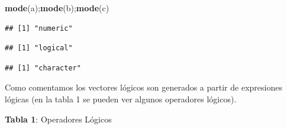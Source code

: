 \documentclass[]{article}
\newenvironment{Shaded}{\begin{snugshade}}{\end{snugshade}}
\newcommand{\KeywordTok}[1]{\textcolor[rgb]{0.13,0.29,0.53}{\textbf{{#1}}}}
\newcommand{\NormalTok}[1]{{#1}}
\begin{document}
\begin{Shaded}
\begin{Highlighting}[]
\KeywordTok{mode}\NormalTok{(a);}\KeywordTok{mode}\NormalTok{(b);}\KeywordTok{mode}\NormalTok{(c)}
\end{Highlighting}
\end{Shaded}

\begin{verbatim}
## [1] "numeric"
\end{verbatim}

\begin{verbatim}
## [1] "logical"
\end{verbatim}

\begin{verbatim}
## [1] "character"
\end{verbatim}

Como comentamos los vectores lógicos son generados a partir de
expresiones lógicas (en la tabla 1 se pueden ver algunos operadores
lógicos).

\textbf{Tabla 1}: Operadores Lógicos
\end{document}

